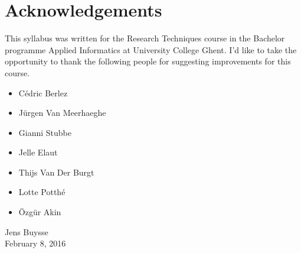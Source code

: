 

\chapter*{Acknowledgements}

This syllabus was written for the Research Techniques course in the Bachelor programme Applied Informatics at University College Ghent. I'd like to take the opportunity to thank the following people for suggesting improvements for this course.

\begin{itemize}
	\item C\'edric Berlez
	\item J\"urgen Van Meerhaeghe
	\item Gianni Stubbe
	\item Jelle Elaut
	\item Thijs Van Der Burgt
	\item Lotte Potth\'e
	\item \"Ozg\"ur Akin
\end{itemize}

\bigskip \bigskip
{\raggedleft%
Jens Buysse\\
February 8, 2016\\
}

